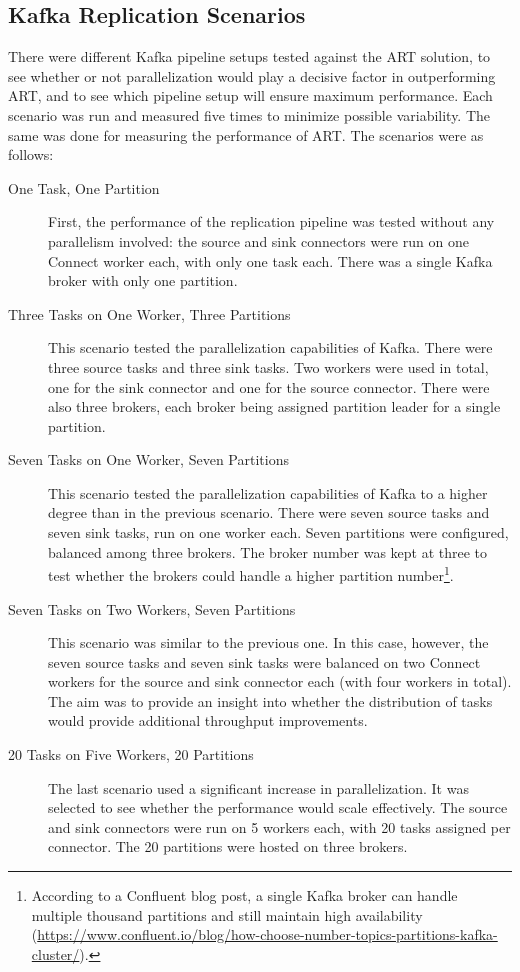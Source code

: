 \subsection{Kafka Replication Scenarios}
\label{ch05:methodology:design:scenarios}
There were different Kafka pipeline setups tested against the \ac{ART} solution, to see whether or not parallelization would play a decisive factor in outperforming \ac{ART}, and to see which pipeline setup will ensure maximum performance. Each scenario was run and measured five times to minimize possible variability. The same was done for measuring the performance of \ac{ART}. The scenarios were as follows:
\begin{description}
    \item [One Task, One Partition]
    First, the performance of the replication pipeline was tested without any parallelism involved: the source and sink connectors were run on one Connect worker each, with only one task each. There was a single Kafka broker with only one partition.

    \item[Three Tasks on One Worker, Three Partitions]
    This scenario tested the parallelization capabilities of Kafka. There were three source tasks and three sink tasks. Two workers were used in total, one for the sink connector and one for the source connector. There were also three brokers, each broker being assigned partition leader for a single partition.

    \item[Seven Tasks on One Worker, Seven Partitions]
    This scenario tested the parallelization capabilities of Kafka to a higher degree than in the previous scenario. There were seven source tasks and seven sink tasks, run on one worker each. Seven partitions were configured, balanced among three brokers. The broker number was kept at three to test whether the brokers could handle a higher partition number\footnote{According to a Confluent blog post, a single Kafka broker can handle multiple thousand partitions and still maintain high availability (\url{https://www.confluent.io/blog/how-choose-number-topics-partitions-kafka-cluster/}).}.

    \item[Seven Tasks on Two Workers, Seven Partitions]
    This scenario was similar to the previous one. In this case, however, the seven source tasks and seven sink tasks were balanced on two Connect workers for the source and sink connector each (with four workers in total). The aim was to provide an insight into whether the distribution of tasks would provide additional throughput improvements.
    
    \item[20 Tasks on Five Workers, 20 Partitions] The last scenario used a significant increase in parallelization. It was selected to see whether the performance would scale effectively. The source and sink connectors were run on 5 workers each, with 20 tasks assigned per connector. The 20 partitions were hosted on three brokers.
    
\end{description}

